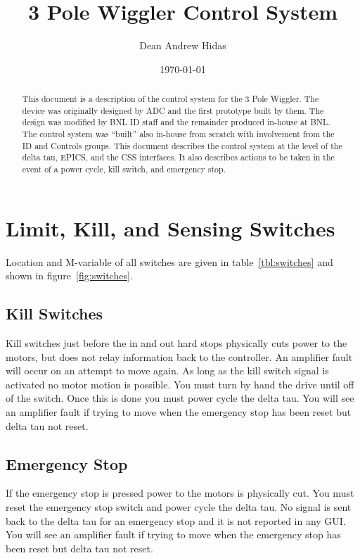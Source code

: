 \documentclass[12pt,letterpaper]{article}
\title{3 Pole Wiggler Control System}
\author{Dean Andrew Hidas}
\date{\today}
\begin{document}
\maketitle

\begin{abstract}
This document is a description of the control system for the 3 Pole Wiggler.  The device was originally designed by ADC and the first prototype built by them.  The design was modified by BNL ID staff and the remainder produced in-house at BNL.  The control system was ``built'' also in-house from scratch with involvement from the ID and Controls groups.  This document describes the control system at the level of the delta tau, EPICS, and the CSS interfaces.  It also describes actions to be taken in the event of a power cycle, kill switch, and emergency stop.
\end{abstract}

\section{Limit, Kill, and Sensing Switches}
Location and M-variable of all switches are given in table~\ref{tbl:switches} and shown in figure~\ref{fig:switches}.

\subsection{Kill Switches}
Kill switches just before the in and out hard stops physically cuts power to the motors, but does not relay information back to the controller.  An amplifier fault will occur on an attempt to move again.  As long as the kill switch signal is activated no motor motion is possible.  You must turn by hand the drive until off of the switch.  Once this is done you must power cycle the delta tau.  You will see an amplifier fault if trying to move when the emergency stop has been reset but delta tau not reset.

\subsection{Emergency Stop}
If the emergency stop is pressed power to the motors is physically cut.  You must reset the emergency stop switch and power cycle the delta tau.  No signal is sent back to the delta tau for an emergency stop and it is not reported in any GUI.  You will see an amplifier fault if trying to move when the emergency stop has been reset but delta tau not reset.
\end{document}
